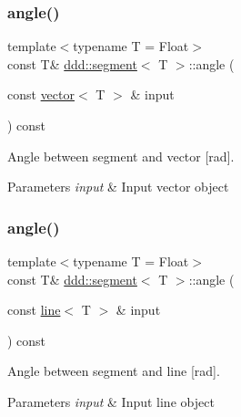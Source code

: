 \subsubsection{\texorpdfstring{angle()}{angle()}\hspace{0.1cm}{\footnotesize\ttfamily [1/4]}}
{\footnotesize\ttfamily template$<$typename T = Float$>$ \\
const T\& \hyperlink{classddd_1_1segment}{ddd\+::segment}$<$ T $>$\+::angle (\begin{DoxyParamCaption}\item[{const \hyperlink{classddd_1_1vector}{vector}$<$ T $>$ \&}]{input }\end{DoxyParamCaption}) const\hspace{0.3cm}{\ttfamily [inline]}}



Angle between segment and vector \mbox{[}rad\mbox{]}. 


\begin{DoxyParams}{Parameters}
{\em input} & Input vector object \\
\hline
\end{DoxyParams}
\mbox{\label{classddd_1_1segment_a63576e5f0bca9dc67f90a7b246345ff7}} 
\subsubsection{\texorpdfstring{angle()}{angle()}\hspace{0.1cm}{\footnotesize\ttfamily [2/4]}}
{\footnotesize\ttfamily template$<$typename T = Float$>$ \\
const T\& \hyperlink{classddd_1_1segment}{ddd\+::segment}$<$ T $>$\+::angle (\begin{DoxyParamCaption}\item[{const \hyperlink{classddd_1_1line}{line}$<$ T $>$ \&}]{input }\end{DoxyParamCaption}) const\hspace{0.3cm}{\ttfamily [inline]}}



Angle between segment and line \mbox{[}rad\mbox{]}. 


\begin{DoxyParams}{Parameters}
{\em input} & Input line object \\
\hline
\end{DoxyParams}
\mbox{\label{classddd_1_1segment_a5c7ab773bb94ce6e8593a3517765efe2}} 
